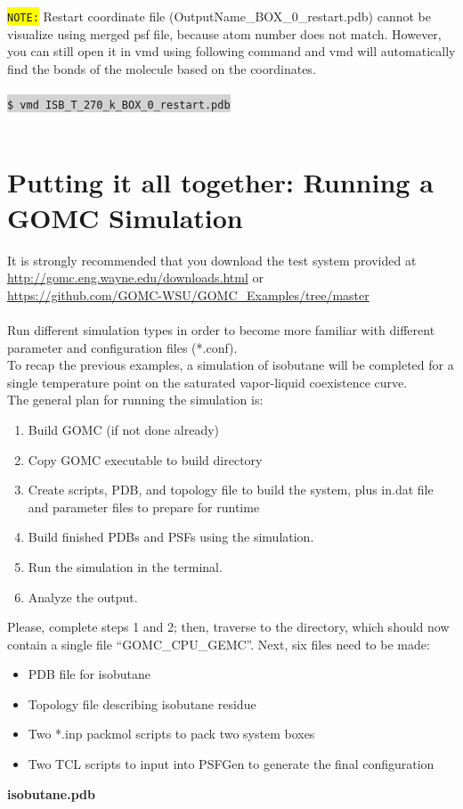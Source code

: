 \colorbox{yellow}{\texttt{NOTE:}} Restart coordinate file (OutputName\_BOX\_0\_restart.pdb) cannot be visualize using merged psf file, because atom number does not match. However, you can still open it in vmd using following command and vmd will automatically find the bonds of the molecule based on the coordinates.\\\\
\colorbox{lightgray}{
\texttt{\$ vmd  ISB\_T\_270\_k\_BOX\_0\_restart.pdb}
}\\\\

\newpage
\section{Putting it all together: Running a GOMC Simulation}
It is strongly recommended that you download the test system provided at\\
\url{http://gomc.eng.wayne.edu/downloads.html} or \\
\url{https://github.com/GOMC-WSU/GOMC_Examples/tree/master}\\\\
Run different simulation types in order to become more familiar with different parameter and configuration files (*.conf).\\
To recap the previous examples, a simulation of isobutane will be completed for a single temperature point on the saturated vapor-liquid coexistence curve.\\
The general plan for running the simulation is:
\begin{enumerate}
\item Build GOMC (if not done already)
\item Copy GOMC executable to build directory
\item Create scripts, PDB, and topology file to build the system, plus in.dat file and parameter files to prepare for runtime
\item Build finished PDBs and PSFs using the simulation.
\item Run the simulation in the terminal.
\item Analyze the output.
\end{enumerate}
Please, complete steps 1 and 2; then, traverse to the directory, which should now contain a single file ``GOMC\_CPU\_GEMC''.
Next, six files need to be made:
\begin{itemize}
\item PDB file for isobutane
\item Topology file describing isobutane residue
\item Two *.inp packmol scripts to pack two system boxes
\item Two TCL scripts to input into PSFGen to generate the final configuration
\end{itemize}
\textbf{isobutane.pdb}\\

